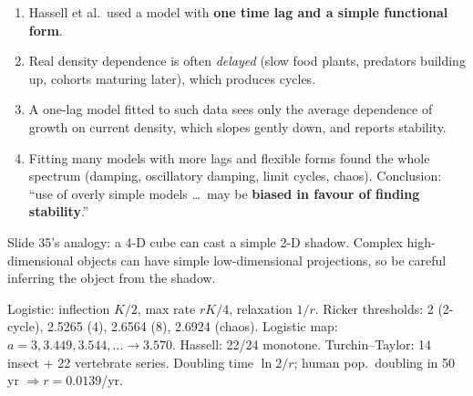 \begin{chain}
\begin{enumerate}
\item Hassell et al.\ used a model with \textbf{one time lag and a simple functional form}.
\item Real density dependence is often \emph{delayed} (slow food plants, predators building up, cohorts maturing
later), which produces cycles.
\item A one-lag model fitted to such data sees only the average dependence of growth on current density, which slopes
gently down, and reports stability.
\item Fitting many models with more lags and flexible forms found the whole spectrum (damping, oscillatory damping,
limit cycles, chaos). Conclusion: ``use of overly simple models \ldots\ may be \textbf{biased in favour of finding
stability}.''
\end{enumerate}
Slide 35's analogy: a 4-D cube can cast a simple 2-D shadow. Complex high-dimensional objects can have simple
low-dimensional projections, so be careful inferring the object from the shadow.
\end{chain}

\begin{numbers}
Logistic: inflection $K/2$, max rate $rK/4$, relaxation $1/r$. Ricker thresholds: 2 (2-cycle), 2.5265 (4), 2.6564 (8),
2.6924 (chaos). Logistic map: $a=3, 3.449, 3.544,\dots\to3.570$. Hassell: 22/24 monotone. Turchin--Taylor: 14 insect +
22 vertebrate series. Doubling time $\ln 2/r$; human pop.\ doubling in 50\,yr $\Rightarrow r=0.0139$/yr.
\end{numbers}

